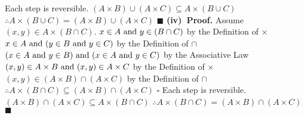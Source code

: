 \documentclass[12pt]{article}
\begin{document}
	Each step is reversible.
	\newline
	\((A \times B) \cup (A \times C) \subseteq A \times (B \cup C)\)
	\newline
	\(\therefore A \times (B \cup C) = (A \times B) \cup (A \times C)\)
	\newline \(\blacksquare\)
	\newline
	\newline
	\textbf{(iv)\ Proof.}
	\newline
	Assume \((x,y) \in A \times (B \cap C)\). \newline
	\(x \in A \textup{ and } y \in (B \cap C)\) by the Definition of \(\times\)
	\newline
	\(x \in A \textup{ and } (y \in B \textup{ and } y \in C)\) by the Definition of \(\cap\)
	\newline
	\((x \in A \textup{ and } y \in B) \textup{ and } (x \in A \textup{ and } y \in C)\) by the Associative Law
	\newline
	\((x,y) \in A \times B \textup{ and } (x,y) \in A \times C\) by the Definition of \(\times\)
	\newline
	\((x,y) \in (A \times B) \cap (A \times C)\) by the Definition of \(\cap\)
	\newline
	\(\therefore A \times (B \cap C) \subseteq (A \times B) \cap (A \times C)\)
	\newline \(\square\) \newline
	Each step is reversible.
	\newline
	\((A \times B) \cap (A \times C) \subseteq A \times (B \cap C)\)
	\newline
	\(\therefore A \times (B \cap C) = (A \times B) \cap (A \times C)\)
	\newline \(\blacksquare\)
	\newpage
\end{document}
